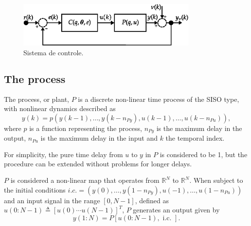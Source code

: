 \begin{figure}[htpb] 
   \centering
   \includegraphics[width=0.8\textwidth]{Figs/diagrama_mf.eps}
   \caption{Sistema de controle.}
   \label{fig:diagrama_MF}
\end{figure}

\subsection{The process}%
\label{sec:TheProcess}

The process, or plant, $P$ is a discrete non-linear time process of the SISO type, with nonlinear dynamics described as
\begin{equation}
   y(k)=p\left(y(k-1), \ldots, y(k-n_{P y}), u(k-1), \ldots, u(k-n_{P u})\right),
   \label{eq:yknl}
\end{equation}
where $p$ is a function representing the process, $n_{P y}$ is the maximum delay in the output, $n_{P u}$ is the maximum delay in the input and $k$ the temporal index.

For simplicity, the pure time delay from $u$ to $y$ in $P$ is considered to be 1, but the procedure can be extended without problems for longer delays.

  $P$ is considered a non-linear map that operates from $\mathbb{R}^{N}$ to $\mathbb{R}^{N}$. When subject to the initial conditions $i.c.= (y(0), \ldots, y(1-n_{P y}), u(-1), \ldots, u(1-n_{P u}) )$ and an input signal in the range $[0, N-1]$, defined as $u(0{:}N-1) \triangleq [u(0) \cdots u(N-1)]^{T}$, $P$ generates an output given by
\begin{equation}
   y(1{:}N) = P[u(0{:}N-1), \text { i.c. }].
\label{eq:Pnl}
\end{equation}

